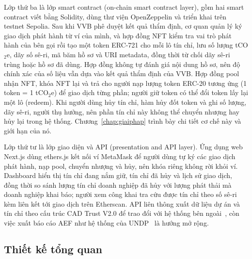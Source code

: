 Lớp thứ ba là lớp smart contract (on-chain smart contract layer), gồm hai smart contract viết bằng Solidity, dùng thư viện OpenZeppelin và triển khai trên testnet Sepolia. Sau khi VVB phê duyệt kết quả thẩm định, cơ quan quản lý ký giao dịch phát hành từ ví của mình, và hợp đồng NFT kiểm tra vai trò phát hành của bên gọi rồi tạo một token ERC-721 cho mỗi lô tín chỉ, lưu số lượng tCO$_2$e, dãy số sê-ri, mã băm hồ sơ và URI metadata, đồng thời từ chối dãy sê-ri trùng hoặc hồ sơ đã dùng. Hợp đồng không tự đánh giá nội dung hồ sơ, nên độ chính xác của số liệu vẫn dựa vào kết quả thẩm định của VVB. Hợp đồng pool nhận NFT, khóa NFT lại và trả cho người nạp lượng token ERC-20 tương ứng (1 token = 1 tCO$_2$e) để giao dịch từng phần; người giữ token có thể đổi token lấy lại một lô (redeem). Khi người dùng hủy tín chỉ, hàm hủy đốt token và ghi số lượng, dãy sê-ri, người thụ hưởng, nên phần tín chỉ này không thể chuyển nhượng hay hủy lại trong hệ thống. Chương~\ref{chap:giaiphap} trình bày chi tiết cơ chế này và giới hạn của nó.

Lớp thứ tư là lớp giao diện và API (presentation and API layer). Ứng dụng web Next.js dùng ethers.js kết nối ví MetaMask để người dùng tự ký các giao dịch phát hành, nạp pool, chuyển nhượng và hủy, nên khóa riêng không rời khỏi ví. Dashboard hiển thị tín chỉ đang nắm giữ, tín chỉ đã hủy và lịch sử giao dịch, đồng thời so sánh lượng tín chỉ doanh nghiệp đã hủy với lượng phát thải mà doanh nghiệp khai báo; người xem công khai tra cứu được tín chỉ theo số sê-ri kèm liên kết tới giao dịch trên Etherscan. API liên thông xuất dữ liệu dự án và tín chỉ theo cấu trúc CAD Trust V2.0 để trao đổi với hệ thống bên ngoài~\cite{cadtrust2025datamodel}, còn việc xuất báo cáo AEF như hệ thống của UNDP~\cite{undp2024nationalregistry} là hướng mở rộng.

\HinhKienTruc

\subsection*{Thiết kế tổng quan}
\label{subsec:tk-tongquan}

